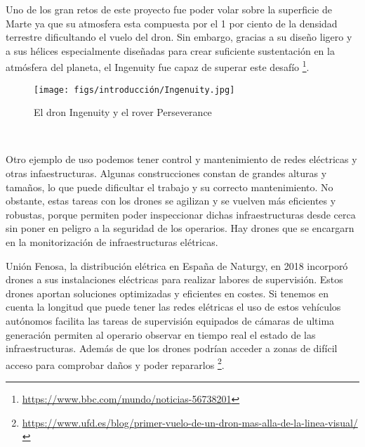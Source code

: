 Uno de los gran retos de este proyecto fue poder volar sobre la superficie de Marte ya que su atmosfera esta compuesta por el 1 por ciento de la densidad terrestre
dificultando el vuelo del dron. Sin embargo, gracias a su diseño ligero y a sus hélices especialmente diseñadas para crear suficiente sustentación en la atmósfera del planeta, el Ingenuity 
fue capaz de superar este desafío \footnote{\url{https://www.bbc.com/mundo/noticias-56738201}}. 

\begin{figure} [H]
  \begin{center}
    \texttt{[image: figs/introducción/Ingenuity.jpg]}
  \end{center}
  \caption{El dron Ingenuity y el rover Perseverance}
  \label{fig:Ingenuity}
\end{figure}\

Otro ejemplo de uso podemos tener control y mantenimiento de redes eléctricas y otras infaestructuras. Algunas construcciones constan de grandes alturas y tamaños, lo que puede
dificultar el trabajo y su correcto mantenimiento. No obstante, estas tareas con los drones se agilizan y se vuelven más eficientes y robustas, porque permiten poder
inspeccionar dichas infraestructuras desde cerca sin poner en peligro a la seguridad de los operarios. 
Hay drones que se encargarn en la monitorización de infraestructuras elétricas. \newline

Unión Fenosa, la distribución elétrica en España de Naturgy, en 2018 incorporó drones a sus instalaciones eléctricas para realizar labores de supervisión. Estos drones aportan 
soluciones optimizadas y eficientes en costes. Si tenemos en cuenta la longitud que puede tener las redes elétricas el uso de estos vehículos
autónomos facilita las tareas de supervisión equipados de cámaras de ultima generación permiten al operario observar en tiempo real el estado de las infraestructuras. Además de que los
drones podrían acceder a zonas de difícil acceso para comprobar daños y poder repararlos \footnote{\url{https://www.ufd.es/blog/primer-vuelo-de-un-dron-mas-alla-de-la-linea-visual/}}. \newline 


